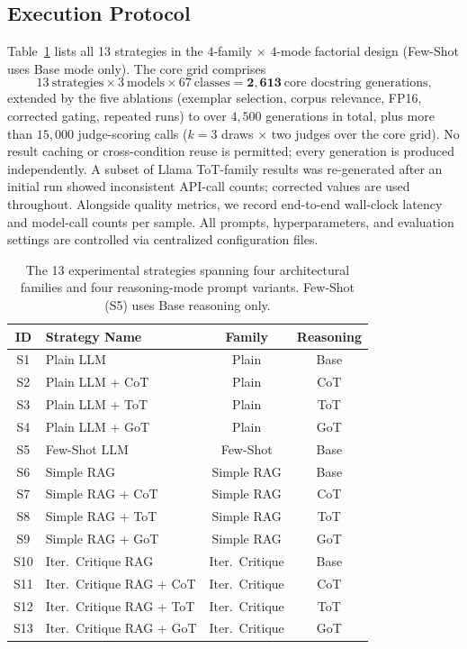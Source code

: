 \documentclass[pdflatex,sn-mathphys-ay]{sn-jnl}%
\theoremstyle{thmstyleone}%
\theoremstyle{thmstyletwo}%
\theoremstyle{thmstylethree}%
\begin{document}
\subsection{Execution Protocol}
\label{sec:protocol}
{\color{blue}
Table~\ref{tab:strategy-matrix} lists all 13 strategies in the $4$-family $\times$ $4$-mode factorial design (Few-Shot uses Base mode only). The core grid comprises
\[ 13\ \text{strategies} \times 3\ \text{models} \times 67\ \text{classes} = \mathbf{2{,}613}\ \text{core docstring generations,} \]
extended by the five ablations (exemplar selection, corpus relevance, FP16, corrected gating, repeated runs) to over $4{,}500$ generations in total, plus more than $15{,}000$ judge-scoring calls ($k{=}3$ draws $\times$ two judges over the core grid). No result caching or cross-condition reuse is permitted; every generation is produced independently. A subset of Llama ToT-family results was re-generated after an initial run showed inconsistent API-call counts; corrected values are used throughout. Alongside quality metrics, we record end-to-end wall-clock latency and model-call counts per sample. All prompts, hyperparameters, and evaluation settings are controlled via centralized configuration files.


}
\begin{table}[t]
\centering
\small
\setlength{\tabcolsep}{6pt}
\caption{The 13 experimental strategies spanning four architectural families and four reasoning-mode prompt variants. Few-Shot (S5) uses Base reasoning only.}
\begin{tabular}{clcc}
\toprule
\textbf{ID} & \textbf{Strategy Name} & \textbf{Family} & \textbf{Reasoning} \\
\midrule
S1  & Plain LLM                 & Plain           & Base \\
S2  & Plain LLM + CoT           & Plain           & CoT  \\
S3  & Plain LLM + ToT           & Plain           & ToT  \\
S4  & Plain LLM + GoT           & Plain           & GoT  \\
\midrule
S5  & Few-Shot LLM              & Few-Shot        & Base \\
\midrule
S6  & Simple RAG                & Simple RAG      & Base \\
S7  & Simple RAG + CoT          & Simple RAG      & CoT  \\
S8  & Simple RAG + ToT          & Simple RAG      & ToT  \\
S9  & Simple RAG + GoT          & Simple RAG      & GoT  \\
\midrule
S10 & Iter.\ Critique RAG       & Iter.\ Critique & Base \\
S11 & Iter.\ Critique RAG + CoT & Iter.\ Critique & CoT  \\
S12 & Iter.\ Critique RAG + ToT & Iter.\ Critique & ToT  \\
S13 & Iter.\ Critique RAG + GoT & Iter.\ Critique & GoT  \\
\bottomrule
\end{tabular}
\label{tab:strategy-matrix}
\end{table}
\end{document}
